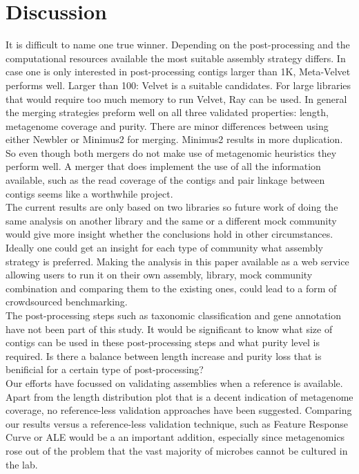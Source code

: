 \documentclass[a4paper,12pt]{report}
\begin{document}
\chapter{Discussion}
It is difficult to name one true winner. Depending on the post-processing and
the computational resources available the most suitable assembly strategy
differs. In case one is only interested in post-processing contigs larger than
1K, Meta-Velvet performs well. Larger than 100: Velvet is a suitable
candidates. For large libraries that would require too much memory to run
Velvet, Ray can be used. In general the merging strategies preform well on all
three validated properties: length, metagenome coverage and purity. There are
minor differences between using either Newbler or Minimus2 for merging.
Minimus2 results in more duplication. So even though both mergers do not make
use of metagenomic heuristics they perform well. A merger that does implement
the use of all the information available, such as the read coverage of the
contigs and pair linkage between contigs seems like a worthwhile project.\\


The current results are only based on two libraries so future work of doing the
same analysis on another library and the same or a different mock community
would give more insight whether the conclusions hold in other circumstances.
Ideally one could get an insight for each type of community what assembly
strategy is preferred. Making the analysis in this paper available as a web
service allowing users to run it on their own assembly, library, mock community
combination and comparing them to the existing ones, could lead to a form of
crowdsourced benchmarking.\\


The post-processing steps such as taxonomic classification and gene annotation
have not been part of this study. It would be significant to know what size of
contigs can be used in these post-processing steps and what purity level is
required. Is there a balance between length increase and purity loss that is
benificial for a certain type of post-processing?\\


Our efforts have focussed on validating assemblies when a reference is
available. Apart from the length distribution plot that is a decent indication
of metagenome coverage, no reference-less validation approaches have been
suggested. Comparing our results versus a reference-less validation technique,
such as Feature Response Curve \cite{TODO} or ALE \cite{TODO} would be a an
important addition, especially since metagenomics rose out of the problem that
the vast majority of microbes cannot be cultured in the lab.
\end{document}
